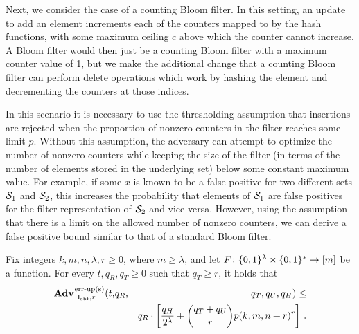 Next, we consider the case of a counting Bloom filter. In this setting, an update to add an element increments each of the counters mapped to by the hash functions, with some maximum ceiling $c$ above which the counter cannot increase. A Bloom filter would then just be a counting Bloom filter with a maximum counter value of 1, but we make the additional change that a counting Bloom filter can perform delete operations which work by hashing the element and decrementing the counters at those indices.

In this scenario it is necessary to use the thresholding assumption that insertions are rejected when the proportion of nonzero counters in the filter reaches some limit $p$. Without this assumption, the adversary can attempt to optimize the number of nonzero counters while keeping the size of the filter (in terms of the number of elements stored in the underlying set) below some constant maximum value. For example, if some $x$ is known to be a false positive for two different sets $\mathcal{S}_1$ and $\mathcal{S}_2$, this increases the probability that elements of $\mathcal{S}_1$ are false positives for the filter representation of $\mathcal{S}_2$ and vice versa. However, using the assumption that there is a limit on the allowed number of nonzero counters, we can derive a false positive bound similar to that of a standard Bloom filter.

\begin{theorem}\label{thm:count-bf-bound}
Fix integers $k, m, n, \lambda, r\geq 0$, where $m \geq \lambda$, and let $F \colon \{0,1\}^\lambda \times \{0,1\}^* \to [m]$ be a function.
  For every $t, q_R, q_T \geq 0$ such that $q_T \geq r$, it holds that
  \begin{eqnarray*}
    \Adv{\erreps}_{\struct_\saltybloom,r}(t,&q_R,& q_T, q_U, q_H) \leq \\ && q_R \cdot
     \left[
      \frac{q_H}{2^\lambda} +
      {\dbinom{q_T+q_U}{r}} p(k, m, n+r)^r
    \right] \,.
\end{eqnarray*}
\end{theorem}

